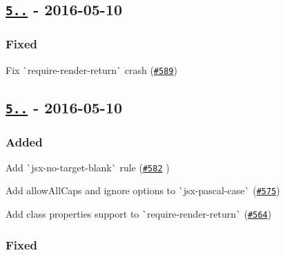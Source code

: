 \subsection*{\href{https://github.com/yannickcr/eslint-plugin-react/compare/v5.1.0...v5.1.1}{\tt 5..} -\/ 2016-\/05-\/10}

\subsubsection*{Fixed}


\begin{DoxyItemize}
\item Fix \`{}require-\/render-\/return\`{} crash (\href{https://github.com/yannickcr/eslint-plugin-react/issues/589}{\tt \#589})
\end{DoxyItemize}

\subsection*{\href{https://github.com/yannickcr/eslint-plugin-react/compare/v5.0.1...v5.1.0}{\tt 5..} -\/ 2016-\/05-\/10}

\subsubsection*{Added}


\begin{DoxyItemize}
\item Add \`{}jsx-\/no-\/target-\/blank\`{} rule (\href{https://github.com/yannickcr/eslint-plugin-react/pull/582}{\tt \#582} )
\item Add {\ttfamily allow\+All\+Caps} and {\ttfamily ignore} options to \`{}jsx-\/pascal-\/case\`{} (\href{https://github.com/yannickcr/eslint-plugin-react/issues/575}{\tt \#575})
\item Add class properties support to \`{}require-\/render-\/return\`{} (\href{https://github.com/yannickcr/eslint-plugin-react/issues/564}{\tt \#564})
\end{DoxyItemize}

\subsubsection*{Fixed}


